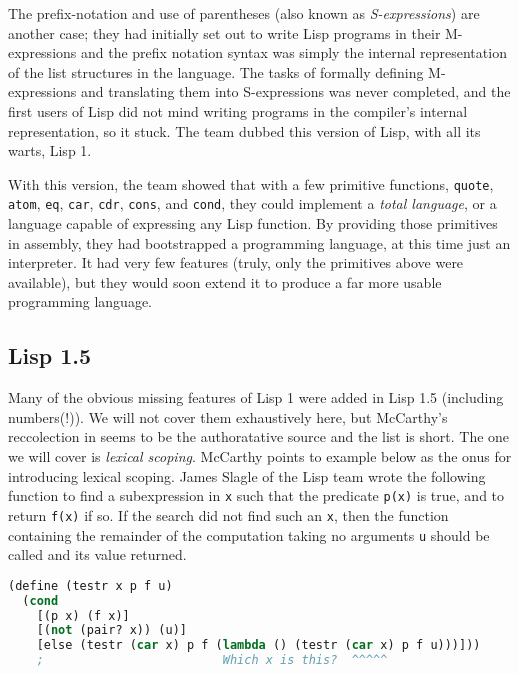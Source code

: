 The prefix-notation and use of parentheses (also known as \textit{S-expressions})
are another case; they had initially set out
to write Lisp programs in their M-expressions and the prefix notation syntax was simply
the internal representation of the list structures in the language.
The tasks of formally defining M-expressions and translating them into S-expressions
was never completed, and the first users of Lisp did not mind writing programs
in the compiler's internal representation, so it stuck.
The team dubbed this version of Lisp, with all its warts, Lisp 1.

With this version, the team showed that with a few primitive functions,
\texttt{quote}, \texttt{atom}, \texttt{eq}, \texttt{car}, \texttt{cdr}, \texttt{cons}, and \texttt{cond},
they could implement a \textit{total language}, or a language capable of expressing
any Lisp function.
By providing those primitives in assembly, they had bootstrapped a programming language,
at this time just an interpreter.
It had very few features (truly, only the primitives above were available),
but they would soon extend it to produce a far more usable programming language.

\subsection{Lisp 1.5}

Many of the obvious missing features of Lisp 1 were added in Lisp 1.5 (including numbers(!)).
We will not cover them exhaustively here, but McCarthy's reccolection in \cite{mccarthy_history_of_lisp_1978}
seems to be the authoratative source and the list is short.
The one we will cover is \textit{lexical scoping}.
McCarthy points to example below as the onus for introducing lexical scoping.
James Slagle of the Lisp team wrote the following function
to find a subexpression in \texttt{x} such that the predicate \texttt{p(x)} is true,
and to return \texttt{f(x)} if so.
If the search did not find such an \texttt{x}, then the function containing
the remainder of the computation taking no arguments \texttt{u} should be called and its value
returned.

\begin{lstlisting}[language=lisp,frame=single]
(define (testr x p f u)
  (cond
    [(p x) (f x)]
    [(not (pair? x)) (u)]
    [else (testr (car x) p f (lambda () (testr (car x) p f u)))]))
    ;                         Which x is this?  ^^^^^
\end{lstlisting}

